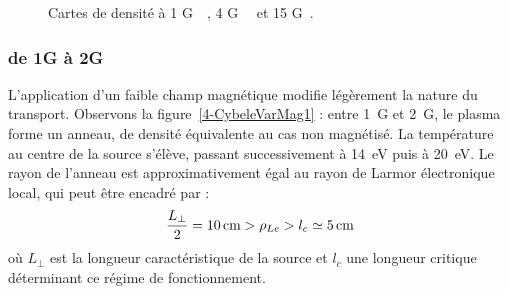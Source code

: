 \begin{refsection}
\begin{figure}[!htb]
  \centering
    \caption{Cartes de densité à 1 G~~, 4
    G~~ et 15 G~.}
    \label{4-CybeleVarMag-1}
\end{figure}

\subsubsection{de 1G à 2G}

L'application d'un faible champ magnétique modifie légèrement la nature du
transport. Observons la figure~\ref{4-CybeleVarMag1} : entre 1~G et 2~G, le
plasma forme un anneau, de densité équivalente au cas non
magnétisé. La température au centre de la source s'élève, passant 
successivement à 14~eV puis à 20~eV. Le rayon de l'anneau est approximativement
égal au rayon de Larmor électronique local, qui peut être encadré par :
\begin{equation}
\frac{L_\perp}{2}=10\,\text{cm}>\rho{_{Le}}>l_c\simeq 5\,\text{cm}
\end{equation}
où $L_\perp$ est la longueur caractéristique de la source et $l_c$ une longueur
critique déterminant ce régime de fonctionnement. 


\end{refsection}
